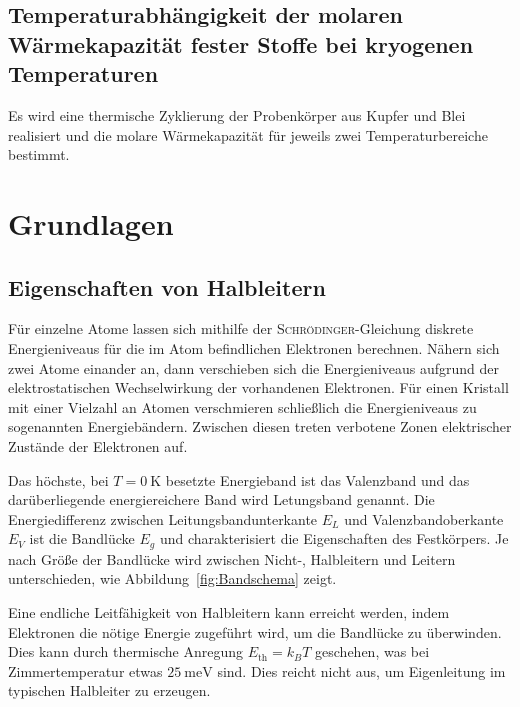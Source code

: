 \documentclass[parskip=half, a4paper,twoside,final]{article}
\begin{document}
\subsection{Temperaturabhängigkeit der molaren Wärmekapazität fester Stoffe bei kryogenen Temperaturen}

Es wird eine thermische Zyklierung der Probenkörper aus Kupfer und Blei realisiert und die molare Wärmekapazität für jeweils zwei Temperaturbereiche bestimmt.



\newpage
\section{Grundlagen} \label{sec:Grundlagen}

\subsection{Eigenschaften von Halbleitern}
Für einzelne Atome lassen sich mithilfe der \textsc{Schrödinger}-Gleichung diskrete Energieniveaus für die im Atom befindlichen Elektronen berechnen. Nähern sich zwei Atome einander an, dann verschieben sich die Energieniveaus aufgrund der elektrostatischen Wechselwirkung der vorhandenen Elektronen. Für einen Kristall mit einer Vielzahl an Atomen verschmieren schließlich die Energieniveaus zu sogenannten Energiebändern. Zwischen diesen treten verbotene Zonen elektrischer Zustände der Elektronen auf.

Das höchste, bei $T=\SI{0}{\kelvin}$ besetzte Energieband ist das Valenzband und das darüberliegende energiereichere Band wird Letungsband genannt. Die Energiedifferenz zwischen Leitungsbandunterkante $E_L$ und Valenzbandoberkante $E_V$ ist die Bandlücke $E_g$ und charakterisiert die Eigenschaften des Festkörpers. Je nach Größe der Bandlücke wird zwischen Nicht-, Halbleitern und Leitern unterschieden, wie Abbildung~\ref{fig:Bandschema} zeigt.



Eine endliche Leitfähigkeit von Halbleitern kann erreicht werden, indem Elektronen die nötige Energie zugeführt wird, um die Bandlücke zu überwinden. Dies kann durch thermische Anregung $E_\text{th} = k_B T$ geschehen, was bei Zimmertemperatur etwas $\SI{25}{\milli\electronvolt}$ sind. Dies reicht nicht aus, um Eigenleitung im typischen Halbleiter zu erzeugen.
\end{document}
